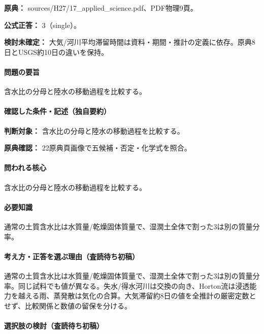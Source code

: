 \noindent\textbf{原典：} sources/H27/17\_applied\_science.pdf、PDF物理9頁。

\textbf{公式正答：} 3（single）。

\par\textbf{検討未確定：} 大気/河川平均滞留時間は資料・期間・推計の定義に依存。原典8日とUSGS約10日の違いを保持。

\paragraph{問題の要旨} 含水比の分母と陸水の移動過程を比較する。

\paragraph{確認した条件・記述（独自要約）}\mbox{}\par

\noindent\textbf{判断対象：} 含水比の分母と陸水の移動過程を比較する。\par

\noindent\textbf{原典確認：} 22原典頁画像で五候補・否定・化学式を照合。\par

\paragraph{問われる核心} 含水比の分母と陸水の移動過程を比較する。

\paragraph{必要知識} 通常の土質含水比は水質量/乾燥固体質量で、湿潤土全体で割った3は別の質量分率。

\paragraph{考え方・正答を選ぶ理由（査読待ち初稿）} 通常の土質含水比は水質量/乾燥固体質量で、湿潤土全体で割った3は別の質量分率。同じ試料でも値が異なる。失水/得水河川は交換の向き、Horton流は浸透能力を越える雨、蒸発散は気化の合算。大気滞留約8日の値を全推計の厳密定数とせず、比較関係と数値の留保を分ける。

\paragraph{選択肢の検討（査読待ち初稿）}\mbox{}\par

